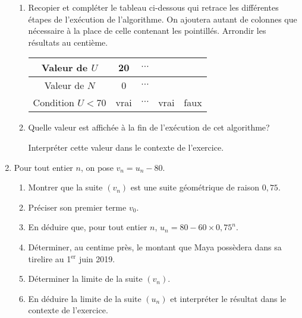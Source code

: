 \begin{enumerate}
     \begin{enumerate}[label=\alph*.]
          \item Recopier et compléter le tableau ci-dessous qui retrace les différentes étapes de l'exécution de l'algorithme. On ajoutera autant de colonnes que nécessaire à la place de celle contenant les pointillés. Arrondir les résultats au centième.
          \begin{center}
               \begin{extern}%
                    \begin{tabular}{|c|c|c|c|c|} \hline
                         Valeur de $U$ & 20 & \hspace*{1cm} $\cdots$  \hspace*{1cm}&  & \\ \hline
                         Valeur de $N$ & 0 &  $\cdots$ & & \\ \hline
                         Condition $U<70$ & vrai & $\cdots$  & vrai & faux \\ \hline
                    \end{tabular}
               \end{extern}
          \end{center}
          \item Quelle valeur est affichée à la fin de l'exécution de cet algorithme?
          \par
          Interpréter cette valeur dans le contexte de l'exercice.
     \end{enumerate}
     \item Pour tout entier $n$, on pose $v_n=u_n-80$.
     \begin{enumerate}[label=\alph*.]
          \item  Montrer que la suite $(v_n)$ est une suite géométrique de raison $0,75$.
          \item Préciser son premier terme $v_0$.
          \item En déduire que, pour tout entier $n$, $u_n=80-60\times 0,75^{n}$.
          \item Déterminer, au centime près, le montant que Maya possèdera dans sa tirelire au 1${^\text{er}}$ juin 2019.
          \item Déterminer la limite de la suite $(v_n)$.
          \item En déduire la limite de la suite $(u_n)$ et interpréter le résultat dans le contexte de l'exercice.
     \end{enumerate}
\end{enumerate}

